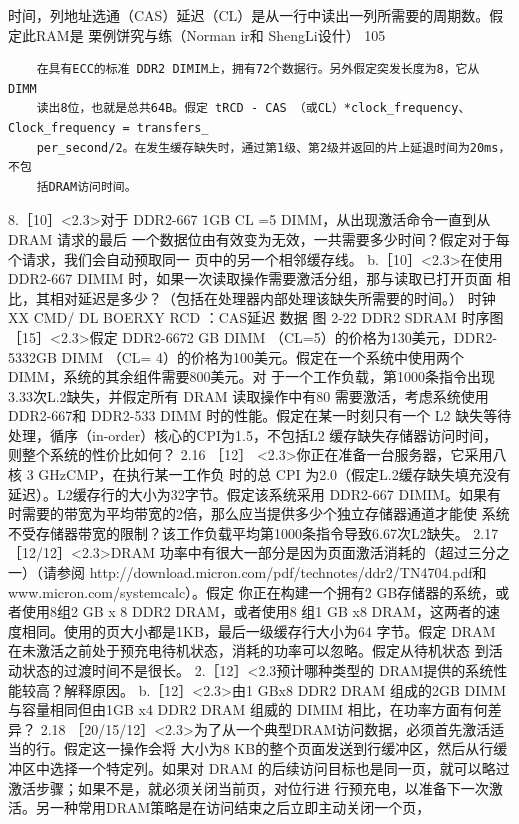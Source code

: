 时间，列地址选通（CAS）延迟（CL）是从一行中读出一列所需要的周期数。假定此RAM是
栗例饼究与练（Norman
ir和 ShengLi设什）
105
\begin{verbatim}
    在具有ECC的标准 DDR2 DIMIM上，拥有72个数据行。另外假定突发长度为8，它从 DIMM
    读出8位，也就是总共64B。假定 tRCD - CAS （或CL）*clock_frequency、Clock_frequency = transfers_
    per_second/2。在发生缓存缺失时，通过第1级、第2级并返回的片上延退时间为20ms，不包
    括DRAM访问时间。
\end{verbatim}
8.［10］<2.3>对于 DDR2-667 1GB CL =5 DIMM，从出现激活命令一直到从 DRAM 请求的最后
一个数据位由有效变为无效，一共需要多少时间？假定对于每个请求，我们会自动预取同一
页中的另一个相邻缓存线。
b.［10］<2.3>在使用 DDR2-667 DIMIM 时，如果一次读取操作需要激活分组，那与读取已打开页面
相比，其相对延迟是多少？（包括在处理器内部处理该缺失所需要的时间。）
时钟
XX
CMD/
DL
BOERXY
RCD
：CAS延迟
数据
图 2-22 DDR2 SDRAM 时序图
［15］<2.3>假定 DDR2-6672 GB DIMM （CL=5）的价格为130美元，DDR2-5332GB DIMM （CL=
4）的价格为100美元。假定在一个系统中使用两个 DIMM，系统的其余组件需要800美元。对
于一个工作负载，第1000条指令出现3.33次L.2缺失，并假定所有 DRAM 读取操作中有80%
需要激活，考虑系统使用 DDR2-667和 DDR2-533 DIMM 时的性能。假定在某一时刻只有一个
L2 缺失等待处理，循序（in-order）核心的CPI为1.5，不包括L2 缓存缺失存储器访问时间，
则整个系统的性价比如何？
2.16
［12］ <2.3>你正在准备一台服务器，它采用八核 3 GHzCMP，在执行某一工作负 时的总 CPI
为2.0（假定L.2缓存缺失填充没有延迟）。L2缓存行的大小为32字节。假定该系统采用 DDR2-667
DIMIM。如果有时需要的带宽为平均带宽的2倍，那么应当提供多少个独立存储器通道才能使
系统不受存储器带宽的限制？该工作负载平均第1000条指令导致6.67次L2缺失。
2.17
［12/12］<2.3>DRAM 功率中有很大一部分是因为页面激活消耗的（超过三分之一）（请参阅
http://download.micron.com/pdf/technotes/ddr2/TN4704.pdf和 www.micron.com/systemcalc）。假定
你正在构建一个拥有2 GB存储器的系统，或者使用8组2 GB x 8 DDR2 DRAM，或者使用8
组1 GB x8 DRAM，这两者的速度相同。使用的页大小都是1KB，最后一级缓存行大小为64
字节。假定 DRAM 在未激活之前处于预充电待机状态，消耗的功率可以忽略。假定从待机状态
到活动状态的过渡时间不是很长。
2.［12］<2.3预计哪种类型的 DRAM提供的系统性能较高？解释原因。
b.［12］<2.3>由1 GBx8 DDR2 DRAM 组成的2GB DIMM 与容量相同但由1GB x4 DDR2 DRAM
组威的 DIMIM 相比，在功率方面有何差异？
2.18
［20/15/12］<2.3>为了从一个典型DRAM访问数据，必须首先激活适当的行。假定这一操作会将
大小为8 KB的整个页面发送到行缓冲区，然后从行缓冲区中选择一个特定列。如果对 DRAM
的后续访问目标也是同一页，就可以略过激活步骤；如果不是，就必须关闭当前页，对位行进
行预充电，以准备下一次激活。另一种常用DRAM策略是在访问结束之后立即主动关闭一个页，
